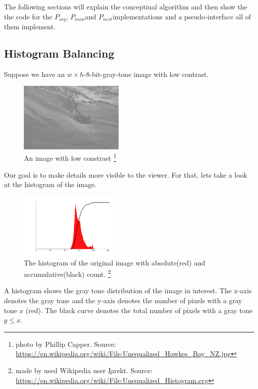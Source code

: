 \documentclass{article}
\newcommand{\seq}[0]{$P_{seq}$}
\newcommand{\man}[0]{$P_{man}$}
\newcommand{\ndpn}[0]{$P_{nest}$}
\begin{document}
    The following sections will explain the conceptiual algorithm
    and then show the the code for the \seq, \man and \ndpn implementations
    and a pseudo-interface all of them implement.
    
    \subsection{Histogram Balancing}
      Suppose we have an $w \times h$-8-bit-gray-tone image with low contrast.
      
      \begin{figure}[h]
        \centering
        \includegraphics[width=0.45\textwidth]{img-org}
        \caption{An image with low constrast
        \footnote{photo by Phillip Capper. Source: \url{https://en.wikipedia.org/wiki/File:Unequalized_Hawkes_Bay_NZ.jpg}}
        }
        \label{fig:img-org}
      \end{figure}
      Our goal is to make details more visible to the viewer. For that,
      lets take a look at the histogram of the image.
      
      \begin{figure}[h]
        \centering
        \includegraphics[width=0.45\textwidth]{hist-org}
        \caption{The histogram of the original image with absolute(red) and accumulative(black) count.
        \footnote{made by used Wikipedia user \c{Jarekt}. Source: \url{https://en.wikipedia.org/wiki/File:Unequalized_Histogram.svg}}
        }
        \label{fig:hist-org}
      \end{figure}
      
      A histogram shows the gray tone distribution of the image in interest.
      The x-axis denotes the gray tone and the y-axis denotes the
      number of pixels with a gray tone $x$ (red). The black curve denotes the
      total number of pixels with a gray tone $g \leq x$.
\end{document}
